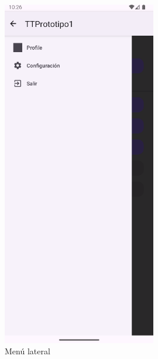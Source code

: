\documentclass[a4paper,openright,12pt]{article}
\begin{document}
\begin{figure}[htp]
\begin{minipage}{0.3\textwidth}
        \includegraphics[width=0.6\textwidth]{Images/Vista_It2_2.png} 
        \caption{Menú lateral}
        \label{fig:Menú lateral}
    \end{minipage}
    \hfill
    \begin{minipage}{0.3\textwidth}
        \centering

\end{minipage}
\end{figure}
\end{document}
